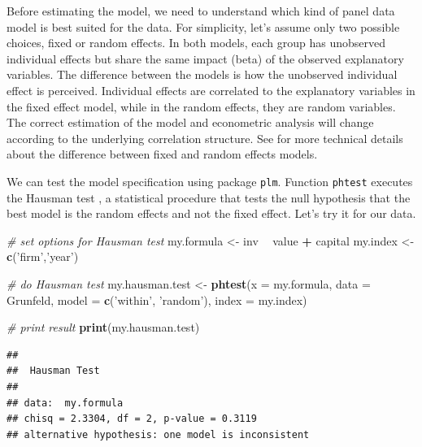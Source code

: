 \documentclass[11pt,]{book}
\newenvironment{Shaded}{\begin{snugshade}}{\end{snugshade}}
\newcommand{\KeywordTok}[1]{\textcolor[rgb]{0.27,0.27,0.27}{\textbf{#1}}}
\newcommand{\DataTypeTok}[1]{\textcolor[rgb]{0.27,0.27,0.27}{#1}}
\newcommand{\StringTok}[1]{\textcolor[rgb]{0.5,0.5,0.5}{#1}}
\newcommand{\CommentTok}[1]{\textcolor[rgb]{0.56,0.35,0.01}{\textit{#1}}}
\newcommand{\OperatorTok}[1]{\textcolor[rgb]{0.81,0.36,0.00}{\textbf{#1}}}
\newcommand{\NormalTok}[1]{#1}
\begin{document}
Before estimating the model, we need to understand which kind of panel
data model is best suited for the data. For simplicity, let's assume
only two possible choices, fixed or random effects. In both models, each
group has unobserved individual effects but share the same impact (beta)
of the observed explanatory variables. The difference between the models
is how the unobserved individual effect is perceived. Individual effects
are correlated to the explanatory variables in the fixed effect model,
while in the random effects, they are random variables. The correct
estimation of the model and econometric analysis will change according
to the underlying correlation structure. See
\citet{greene2003econometric} for more technical details about the
difference between fixed and random effects models.

We can test the model specification using package \texttt{plm}. Function
\texttt{phtest} executes the Hausman test
\citep{hausman1978specification}, a statistical procedure that tests the
null hypothesis that the best model is the random effects and not the
fixed effect. Let's try it for our data.

\begin{Shaded}
\begin{Highlighting}[]
\CommentTok{# set options for Hausman test}
\NormalTok{my.formula <-}\StringTok{ }\NormalTok{inv }\OperatorTok{~}\StringTok{ }\NormalTok{value }\OperatorTok{+}\StringTok{ }\NormalTok{capital}
\NormalTok{my.index <-}\StringTok{ }\KeywordTok{c}\NormalTok{(}\StringTok{'firm'}\NormalTok{,}\StringTok{'year'}\NormalTok{)}

\CommentTok{# do Hausman test}
\NormalTok{my.hausman.test <-}\StringTok{ }\KeywordTok{phtest}\NormalTok{(}\DataTypeTok{x =}\NormalTok{ my.formula, }
                          \DataTypeTok{data =}\NormalTok{ Grunfeld,}
                          \DataTypeTok{model =} \KeywordTok{c}\NormalTok{(}\StringTok{'within'}\NormalTok{, }\StringTok{'random'}\NormalTok{),}
                          \DataTypeTok{index =}\NormalTok{ my.index)}

\CommentTok{# print result}
\KeywordTok{print}\NormalTok{(my.hausman.test)}
\end{Highlighting}
\end{Shaded}

\begin{verbatim}
## 
##  Hausman Test
## 
## data:  my.formula
## chisq = 2.3304, df = 2, p-value = 0.3119
## alternative hypothesis: one model is inconsistent
\end{verbatim}
\end{document}
